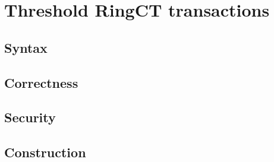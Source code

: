
\section{Threshold RingCT transactions}

\subsection{Syntax}
\subsection{Correctness}
\subsection{Security}
\subsection{Construction}

\newpage
